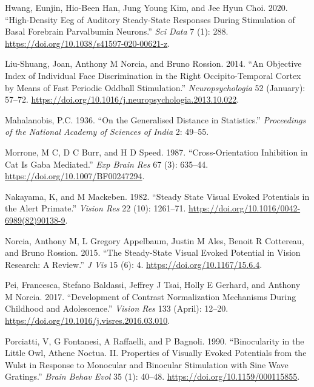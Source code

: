 \documentclass[]{article}
\begin{document}
\leavevmode\hypertarget{ref-Hwang2020}{}%
Hwang, Eunjin, Hio-Been Han, Jung Young Kim, and Jee Hyun Choi. 2020. ``High-Density Eeg of Auditory Steady-State Responses During Stimulation of Basal Forebrain Parvalbumin Neurons.'' \emph{Sci Data} 7 (1): 288. \url{https://doi.org/10.1038/s41597-020-00621-z}.

\leavevmode\hypertarget{ref-Liu-Shuang2014}{}%
Liu-Shuang, Joan, Anthony M Norcia, and Bruno Rossion. 2014. ``An Objective Index of Individual Face Discrimination in the Right Occipito-Temporal Cortex by Means of Fast Periodic Oddball Stimulation.'' \emph{Neuropsychologia} 52 (January): 57--72. \url{https://doi.org/10.1016/j.neuropsychologia.2013.10.022}.

\leavevmode\hypertarget{ref-Mahalanobis1936}{}%
Mahalanobis, P.C. 1936. ``On the Generalised Distance in Statistics.'' \emph{Proceedings of the National Academy of Sciences of India} 2: 49--55.

\leavevmode\hypertarget{ref-Morrone1987}{}%
Morrone, M C, D C Burr, and H D Speed. 1987. ``Cross-Orientation Inhibition in Cat Is Gaba Mediated.'' \emph{Exp Brain Res} 67 (3): 635--44. \url{https://doi.org/10.1007/BF00247294}.

\leavevmode\hypertarget{ref-Nakayama1982}{}%
Nakayama, K, and M Mackeben. 1982. ``Steady State Visual Evoked Potentials in the Alert Primate.'' \emph{Vision Res} 22 (10): 1261--71. \url{https://doi.org/10.1016/0042-6989(82)90138-9}.

\leavevmode\hypertarget{ref-Norcia2015}{}%
Norcia, Anthony M, L Gregory Appelbaum, Justin M Ales, Benoit R Cottereau, and Bruno Rossion. 2015. ``The Steady-State Visual Evoked Potential in Vision Research: A Review.'' \emph{J Vis} 15 (6): 4. \url{https://doi.org/10.1167/15.6.4}.

\leavevmode\hypertarget{ref-Pei2017}{}%
Pei, Francesca, Stefano Baldassi, Jeffrey J Tsai, Holly E Gerhard, and Anthony M Norcia. 2017. ``Development of Contrast Normalization Mechanisms During Childhood and Adolescence.'' \emph{Vision Res} 133 (April): 12--20. \url{https://doi.org/10.1016/j.visres.2016.03.010}.

\leavevmode\hypertarget{ref-Porciatti1990}{}%
Porciatti, V, G Fontanesi, A Raffaelli, and P Bagnoli. 1990. ``Binocularity in the Little Owl, Athene Noctua. II. Properties of Visually Evoked Potentials from the Wulst in Response to Monocular and Binocular Stimulation with Sine Wave Gratings.'' \emph{Brain Behav Evol} 35 (1): 40--48. \url{https://doi.org/10.1159/000115855}.
\end{document}
